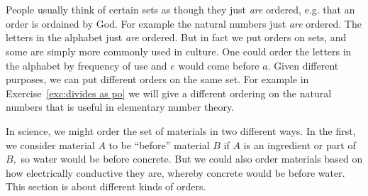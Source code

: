 \documentclass[CT4S-EN-RU]{subfiles}
\begin{document}
\section{}\label{sec:orders}

\begin{blockENG}
People usually think of certain sets as though they just {\em are} ordered, e.g. that an order is ordained by God. For example the natural numbers just {\em are} ordered. The letters in the alphabet just {\em are} ordered. But in fact we put orders on sets, and some are simply more commonly used in culture. One could order the letters in the alphabet by frequency of use and $e$ would come before $a.$ Given different purposes, we can put different orders on the same set. For example in Exercise~\ref{exc:divides as po} we will give a different ordering on the natural numbers that is useful in elementary number theory.
\end{blockENG}

\begin{blockRUS}
\end{blockRUS}

\begin{blockENG}
In science, we might order the set of materials in two different ways. In the first, we consider material $A$ to be “before” material $B$ if $A$ is an ingredient or part of $B,$ so water would be before concrete. But we could also order materials based on how electrically conductive they are, whereby concrete would be before water. This section is about different kinds of orders.
\end{blockENG}


\subsection{}
\end{document}
